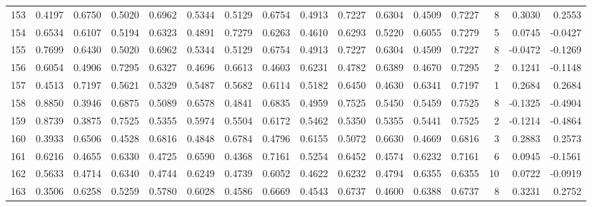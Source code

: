 \begin{tabular}{lrrrrrrrrrrrrrrr}
153 &      0.4197 &  0.6750 &  0.5020 &  0.6962 &  0.5344 &  0.5129 &  0.6754 &  0.4913 &  0.7227 &  0.6304 &   0.4509 &     0.7227 &      8 &                    0.3030 &                     0.2553 \\
154 &      0.6534 &  0.6107 &  0.5194 &  0.6323 &  0.4891 &  0.7279 &  0.6263 &  0.4610 &  0.6293 &  0.5220 &   0.6055 &     0.7279 &      5 &                    0.0745 &                    -0.0427 \\
155 &      0.7699 &  0.6430 &  0.5020 &  0.6962 &  0.5344 &  0.5129 &  0.6754 &  0.4913 &  0.7227 &  0.6304 &   0.4509 &     0.7227 &      8 &                   -0.0472 &                    -0.1269 \\
156 &      0.6054 &  0.4906 &  0.7295 &  0.6327 &  0.4696 &  0.6613 &  0.4603 &  0.6231 &  0.4782 &  0.6389 &   0.4670 &     0.7295 &      2 &                    0.1241 &                    -0.1148 \\
157 &      0.4513 &  0.7197 &  0.5621 &  0.5329 &  0.5487 &  0.5682 &  0.6114 &  0.5182 &  0.6450 &  0.4630 &   0.6341 &     0.7197 &      1 &                    0.2684 &                     0.2684 \\
158 &      0.8850 &  0.3946 &  0.6875 &  0.5089 &  0.6578 &  0.4841 &  0.6835 &  0.4959 &  0.7525 &  0.5450 &   0.5459 &     0.7525 &      8 &                   -0.1325 &                    -0.4904 \\
159 &      0.8739 &  0.3875 &  0.7525 &  0.5355 &  0.5974 &  0.5504 &  0.6172 &  0.5462 &  0.5350 &  0.5355 &   0.5441 &     0.7525 &      2 &                   -0.1214 &                    -0.4864 \\
160 &      0.3933 &  0.6506 &  0.4528 &  0.6816 &  0.4848 &  0.6784 &  0.4796 &  0.6155 &  0.5072 &  0.6630 &   0.4669 &     0.6816 &      3 &                    0.2883 &                     0.2573 \\
161 &      0.6216 &  0.4655 &  0.6330 &  0.4725 &  0.6590 &  0.4368 &  0.7161 &  0.5254 &  0.6452 &  0.4574 &   0.6232 &     0.7161 &      6 &                    0.0945 &                    -0.1561 \\
162 &      0.5633 &  0.4714 &  0.6340 &  0.4744 &  0.6249 &  0.4739 &  0.6052 &  0.4622 &  0.6232 &  0.4794 &   0.6355 &     0.6355 &     10 &                    0.0722 &                    -0.0919 \\
163 &      0.3506 &  0.6258 &  0.5259 &  0.5780 &  0.6028 &  0.4586 &  0.6669 &  0.4543 &  0.6737 &  0.4600 &   0.6388 &     0.6737 &      8 &                    0.3231 &                     0.2752 \\

\end{tabular}
